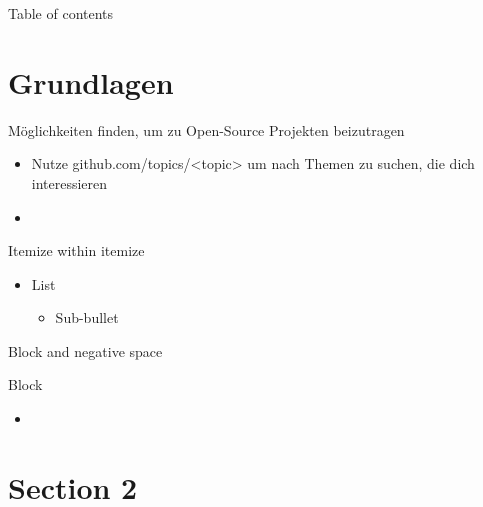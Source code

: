 \documentclass[compress,aspectratio=169]{beamer}
\begin{document}
\begin{frame}[plain]
	\titlepage
\end{frame}

\begin{frame}[t]{Table of contents}
  \tableofcontents[subsectionstyle=hide/hide]
\end{frame}


\section{Grundlagen}

\begin{frame}{Möglichkeiten finden, um zu Open-Source Projekten beizutragen}
  \begin{itemize}
    \item Nutze github.com/topics/<topic> um nach Themen zu suchen, die dich interessieren
    \item 
  \end{itemize}
\end{frame}

\begin{frame}{Itemize within itemize}
    \begin{itemize}
        \item List
            \begin{itemize}
                \item Sub-bullet
            \end{itemize}
    \end{itemize}
\end{frame}

\begin{frame}{Block and negative space}
    \vspace*{-3em} %
    \begin{block}{Block}
        \begin{itemize}
            \item
        \end{itemize}
    \end{block}
\end{frame}


\section{Section 2}
\sectionIntroHidden %
\end{document}
